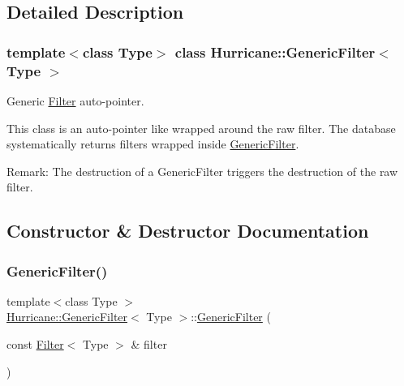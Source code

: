\subsection{Detailed Description}
\subsubsection*{template$<$class Type$>$\newline
class Hurricane\+::\+Generic\+Filter$<$ Type $>$}

Generic \mbox{\hyperlink{classHurricane_1_1Filter}{Filter}} auto-\/pointer. 

This class is an auto-\/pointer like wrapped around the raw filter. The database systematically returns filters wrapped inside \mbox{\hyperlink{classHurricane_1_1GenericFilter}{Generic\+Filter}}.

\begin{DoxyParagraph}{Remark\+: The destruction of a Generic\+Filter triggers the destruction of}
the raw filter. 
\end{DoxyParagraph}


\subsection{Constructor \& Destructor Documentation}
\mbox{\label{classHurricane_1_1GenericFilter_a1aae208fe9937dd3a6f706ceb8b3b9b4}} 
\subsubsection{\texorpdfstring{Generic\+Filter()}{GenericFilter()}\hspace{0.1cm}{\footnotesize\ttfamily [1/3]}}
{\footnotesize\ttfamily template$<$class Type $>$ \\
\mbox{\hyperlink{classHurricane_1_1GenericFilter}{Hurricane\+::\+Generic\+Filter}}$<$ Type $>$\+::\mbox{\hyperlink{classHurricane_1_1GenericFilter}{Generic\+Filter}} (\begin{DoxyParamCaption}\item[{const \mbox{\hyperlink{classHurricane_1_1Filter}{Filter}}$<$ Type $>$ \&}]{filter }\end{DoxyParamCaption})\hspace{0.3cm}{\ttfamily [inline]}}

